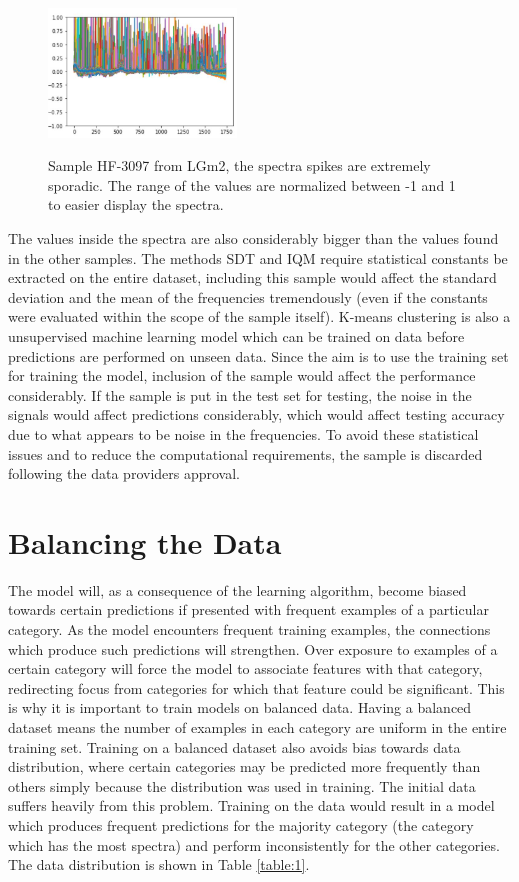 \begin{figure}[H]

    \centering
{\includegraphics[width=5cm]{images/HF_3097.JPG} }
\caption{Sample HF-3097 from LGm2, the spectra spikes are extremely sporadic. The range of the values are normalized between -1 and 1 to easier display the spectra.\label{fig:HF3097}}%

\end{figure}

The values inside the spectra are also considerably bigger than the values found in the other samples. The methods SDT and IQM require statistical constants be extracted on the entire dataset, including this sample would affect the standard deviation and the mean of the frequencies tremendously (even if the constants were evaluated within the scope of the sample itself). K-means clustering is also a unsupervised machine learning model which can be trained on data before predictions are performed on unseen data. Since the aim is to use the training set  for training the model, inclusion of the sample would affect the performance considerably. If the sample is put in the test set for testing, the noise in the signals would affect predictions considerably, which would affect testing accuracy due to what appears to be noise in the frequencies. To avoid these statistical issues and to reduce the computational requirements, the sample is discarded following the data providers approval.


\section{Balancing the Data}
The model will, as a consequence of the learning algorithm, become biased towards certain predictions if presented with frequent examples of a particular category. As the model encounters frequent training examples, the connections which produce such predictions will strengthen. Over exposure to examples of a certain category will force the model to associate features with that category, redirecting focus from categories for which that feature could be significant. This is why it is important to train models on balanced data. Having a balanced dataset means the number of examples in each category are uniform in the entire training set. Training on a balanced dataset also avoids bias towards data distribution, where certain categories may be predicted more frequently than others simply because the distribution was used in training. The initial data suffers heavily from this problem. Training on the data would result in a model which produces frequent predictions for the majority category (the category which has the most spectra) and perform inconsistently for the other categories. The data distribution is shown in Table \ref{table:1}.

